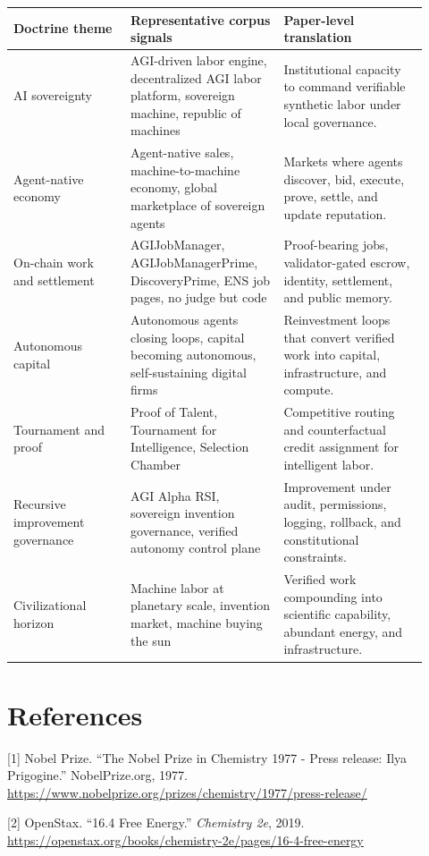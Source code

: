 \documentclass[
  11pt,
]{article}
\begin{document}
\begin{longtable}[]{@{}>{\raggedright\arraybackslash}p{0.26\linewidth}>{\raggedright\arraybackslash}p{0.34\linewidth}>{\raggedright\arraybackslash}p{0.32\linewidth}@{}}
\toprule
Doctrine theme & Representative corpus signals & Paper-level translation \\
\midrule
\endhead
AI sovereignty & AGI-driven labor engine, decentralized AGI labor platform, sovereign machine, republic of machines & Institutional capacity to command verifiable synthetic labor under local governance. \\
Agent-native economy & Agent-native sales, machine-to-machine economy, global marketplace of sovereign agents & Markets where agents discover, bid, execute, prove, settle, and update reputation. \\
On-chain work and settlement & AGIJobManager, AGIJobManagerPrime, DiscoveryPrime, ENS job pages, no judge but code & Proof-bearing jobs, validator-gated escrow, identity, settlement, and public memory. \\
Autonomous capital & Autonomous agents closing loops, capital becoming autonomous, self-sustaining digital firms & Reinvestment loops that convert verified work into capital, infrastructure, and compute. \\
Tournament and proof & Proof of Talent, Tournament for Intelligence, Selection Chamber & Competitive routing and counterfactual credit assignment for intelligent labor. \\
Recursive improvement governance & AGI Alpha RSI, sovereign invention governance, verified autonomy control plane & Improvement under audit, permissions, logging, rollback, and constitutional constraints. \\
Civilizational horizon & Machine labor at planetary scale, invention market, machine buying the sun & Verified work compounding into scientific capability, abundant energy, and infrastructure. \\
\bottomrule
\end{longtable}

\section{References}\label{references}

{[}1{]} Nobel Prize. ``The Nobel Prize in Chemistry 1977 - Press
release: Ilya Prigogine.'' NobelPrize.org, 1977.
\url{https://www.nobelprize.org/prizes/chemistry/1977/press-release/}

{[}2{]} OpenStax. ``16.4 Free Energy.'' \emph{Chemistry 2e}, 2019.
\url{https://openstax.org/books/chemistry-2e/pages/16-4-free-energy}
\end{document}
